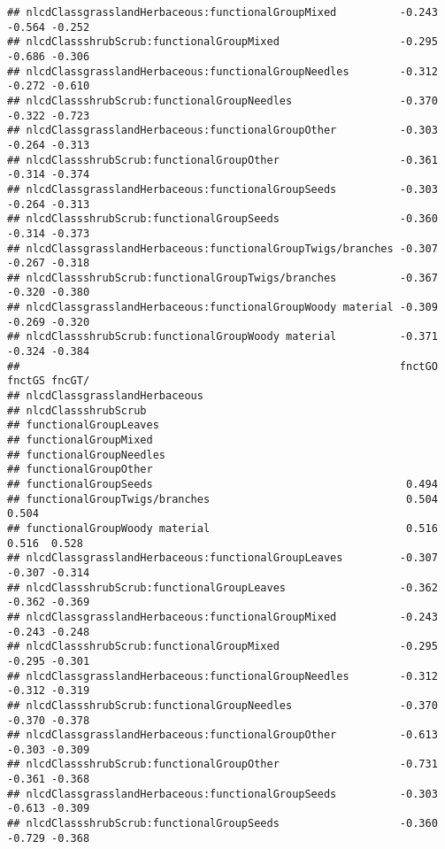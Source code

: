 \documentclass[]{article}
\begin{document}
\begin{verbatim}
## nlcdClassgrasslandHerbaceous:functionalGroupMixed          -0.243 -0.564 -0.252
## nlcdClassshrubScrub:functionalGroupMixed                   -0.295 -0.686 -0.306
## nlcdClassgrasslandHerbaceous:functionalGroupNeedles        -0.312 -0.272 -0.610
## nlcdClassshrubScrub:functionalGroupNeedles                 -0.370 -0.322 -0.723
## nlcdClassgrasslandHerbaceous:functionalGroupOther          -0.303 -0.264 -0.313
## nlcdClassshrubScrub:functionalGroupOther                   -0.361 -0.314 -0.374
## nlcdClassgrasslandHerbaceous:functionalGroupSeeds          -0.303 -0.264 -0.313
## nlcdClassshrubScrub:functionalGroupSeeds                   -0.360 -0.314 -0.373
## nlcdClassgrasslandHerbaceous:functionalGroupTwigs/branches -0.307 -0.267 -0.318
## nlcdClassshrubScrub:functionalGroupTwigs/branches          -0.367 -0.320 -0.380
## nlcdClassgrasslandHerbaceous:functionalGroupWoody material -0.309 -0.269 -0.320
## nlcdClassshrubScrub:functionalGroupWoody material          -0.371 -0.324 -0.384
##                                                            fnctGO fnctGS fncGT/
## nlcdClassgrasslandHerbaceous                                                   
## nlcdClassshrubScrub                                                            
## functionalGroupLeaves                                                          
## functionalGroupMixed                                                           
## functionalGroupNeedles                                                         
## functionalGroupOther                                                           
## functionalGroupSeeds                                        0.494              
## functionalGroupTwigs/branches                               0.504  0.504       
## functionalGroupWoody material                               0.516  0.516  0.528
## nlcdClassgrasslandHerbaceous:functionalGroupLeaves         -0.307 -0.307 -0.314
## nlcdClassshrubScrub:functionalGroupLeaves                  -0.362 -0.362 -0.369
## nlcdClassgrasslandHerbaceous:functionalGroupMixed          -0.243 -0.243 -0.248
## nlcdClassshrubScrub:functionalGroupMixed                   -0.295 -0.295 -0.301
## nlcdClassgrasslandHerbaceous:functionalGroupNeedles        -0.312 -0.312 -0.319
## nlcdClassshrubScrub:functionalGroupNeedles                 -0.370 -0.370 -0.378
## nlcdClassgrasslandHerbaceous:functionalGroupOther          -0.613 -0.303 -0.309
## nlcdClassshrubScrub:functionalGroupOther                   -0.731 -0.361 -0.368
## nlcdClassgrasslandHerbaceous:functionalGroupSeeds          -0.303 -0.613 -0.309
## nlcdClassshrubScrub:functionalGroupSeeds                   -0.360 -0.729 -0.368

\end{verbatim}
\end{document}

